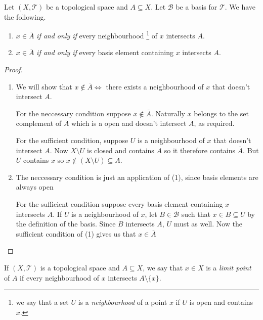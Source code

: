 \begin{thm}
  \label{thm:closure-equivalent}
  Let $(X, \mathscr{T})$ be a topological space and $A \subseteq
  X$. Let $\mathscr{B}$ be a basis for $\mathscr{T}$. We have the
  following.
  \begin{enumerate}
  \item $x \in \overline{A}$ \emph{if and only if} every
    neighbourhood \footnote{we say that a set $U$ is a
      \emph{neighbourhood} of a point $x$ if $U$ is open and contains
      $x$.} of $x$ intersects $A$.
  \item $x \in \overline{A}$ \emph{if and only if} every
    basis element containing $x$ intersects $A$.
  \end{enumerate}
\end{thm}

\begin{proof}
  \begin{enumerate}
  \item We will show that $x \not\in \overline{A} \iff$ there exists a
    neighbourhood of $x$ that doesn't intersect $A$.

    For the neccessary condition suppose $x \not\in
    \overline{A}$. Naturally $x$ belongs to the set complement of
    $\overline{A}$ which is a open and doesn't intersect $A$, as
    required.
    
    For the sufficient condition, suppose $U$ is a neighbourhood
    of $x$ that doesn't intersect $A$. Now $X \setminus U$ is closed
    and contains $A$ so it therefore contains $\overline{A}$. But $U$
    contains $x$ so $x \not\in (X \setminus U) \subseteq
    \overline{A}$.
  \item The neccessary condition is just an application of (1), since
    basis elements are always open

    For the sufficient condition suppose every basis element
    containing $x$ intersects $A$. If $U$ is a neighbourhood of $x$,
    let $B \in \mathscr{B}$ such that $x \in B \subseteq U$ by the
    definition of the basis. Since $B$ intersects $A$, $U$ must as
    well. Now the sufficient condition of (1) gives us that $x \in
    \overline{A}$ 
  \end{enumerate}
\end{proof}

\begin{defn}
  If $(X, \mathscr{T})$ is a topological space and $A \subseteq X$, we
  say that $x \in X$ is a \emph{limit point} of $A$ if every
  neighbourhood of $x$ intersects $A \setminus \{ x \}$. 
\end{defn}

